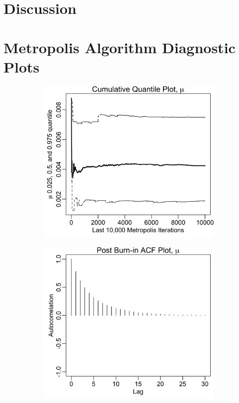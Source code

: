 \documentclass{uwstat572}
\begin{document}
\section{Discussion}

\newpage


\newpage
\appendix
\section{Metropolis Algorithm Diagnostic Plots}
\label{metropolis_plots}

\begin{figure}[H]
	\centering
	\begin{subfigure}[b]{0.49\textwidth}
		\includegraphics[width=\textwidth]{figures/mcmc_cum_quant_plot_mu.png}
		\caption{}
		\label{fig:quant_mu}
	\end{subfigure}
	\hfill
	\begin{subfigure}[b]{0.49\textwidth}
		\includegraphics[width=\textwidth]{figures/mcmc_acf_plot_mu.png}

\end{subfigure}
\end{figure}
\end{document}
